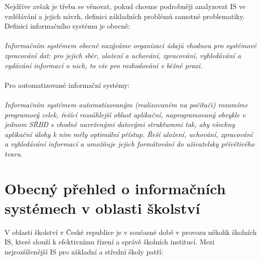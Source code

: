 \documentclass[FM,Proj]{tulthesis}
\begin{document}
Nejdříve avšak je třeba se věnovat, pokud chceme podrobněji analyzovat IS ve vzdělávání 
a jejich návrh, definici základních problémů samotné problematiky. Definicí 
informačního systému je obecně:
\\\\
\textit{Informačním systémem obecně nazýváme organizaci údajů vhodnou pro systémové 
zpracování dat: pro jejich sběr, uložení a uchování, zpracování, vyhledávání a vydávání 
informací o nich, to vše pro rozhodování v běžné praxi.}\cite{Sarmanova2008ISaDS}
\\\\
Pro automatizované informační systémy:
\\\\
\textit{Informačním systémem automatizovaným (realizovaném na počítači) rozumíme programový 
celek, řešící rozsáhlejší oblast aplikační, naprogramovaný obvykle v jednom SŘBD s 
vhodně navrženými datovými strukturami tak, aby všechny aplikační úlohy k nim měly optimální 
přístup. Řeší uložení, uchování, zpracování a vyhledávání informací a umožňuje jejich 
formátování do uživatelsky přívětivého tvaru.}\cite{Sarmanova2008ISaDS}

\section{Obecný přehled o informačních systémech v oblasti školství}
V oblasti školství v České republice je v současné době v provozu několik školních 
IS, které slouží k efektivnímu řízení a správě školních institucí. 
Mezi nejrozšířenější IS pro základní a střední školy patří:
\end{document}

